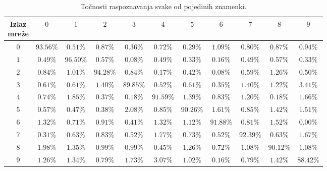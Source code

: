 \begin{table}[htb]
    \caption{Točnosti raspoznavanja svake od pojedinih znamenki.}
    \label{tab:per-number-results}
    \scriptsize
    \centering
    \setlength{\tabcolsep}{0.05cm}
    \begin{tabular}{|c|c|c|c|c|c|c|c|c|c|c|}
        \hline
        \diagbox{Očekivana\\znamenka}{Izlaz\\mreže} & $0$ & $1$ & $2$ & $3$ & $4$ & $5$ & $6$ & $7$ & $8$ & $9$ \\
        \hline
        $0$ & $\boldsymbol{93.56\%}$ & $0.51\%$ & $0.87\%$ & $0.36\%$ & $0.72\%$ & $0.29\%$ & $1.09\%$ & $0.80\%$
        & $0.87\%$ & $0.94\%$ \\
        \hline
        $1$ & $0.49\%$ & $\boldsymbol{96.50\%}$ & $0.57\%$ & $0.08\%$ & $0.49\%$ & $0.33\%$ & $0.16\%$ & $0.49\%$
        & $0.57\%$ & $0.33\%$ \\
        \hline
        $2$ & $0.84\%$ & $1.01\%$ & $\boldsymbol{94.28\%}$ & $0.84\%$ & $0.17\%$ & $0.42\%$ & $0.08\%$ & $0.59\%$
        & $1.26\%$ & $0.50\%$ \\
        \hline
        $3$ & $0.61\%$ & $0.61\%$ & $1.40\%$ & $\boldsymbol{89.85\%}$ & $0.52\%$ & $0.61\%$ & $0.35\%$ & $1.40\%$
        & $1.22\%$ & $3.41\%$ \\
        \hline
        $4$ & $0.74\%$ & $1.85\%$ & $0.37\%$ & $0.18\%$ & $\boldsymbol{91.59\%}$ & $1.39\%$ & $0.83\%$ & $1.20\%$
        & $0.18\%$ & $1.66\%$ \\
        \hline
        $5$ & $0.57\%$ & $0.47\%$ & $0.38\%$ & $2.08\%$ & $0.85\%$ & $\boldsymbol{90.26\%}$ & $1.61\%$ & $0.85\%$
        & $1.42\%$ & $1.51\%$ \\
        \hline
        $6$ & $1.32\%$ & $0.71\%$ & $0.91\%$ & $0.41\%$ & $1.32\%$ & $1.12\%$ & $\boldsymbol{91.88\%}$ & $0.81\%$
        & $1.52\%$ & $0.00\%$ \\
        \hline
        $7$ & $0.31\%$ & $0.63\%$ & $0.83\%$ & $0.52\%$ & $1.77\%$ & $0.73\%$ & $0.52\%$ & $\boldsymbol{92.39\%}$
        & $0.63\%$ & $1.67\%$ \\
        \hline
        $8$ & $1.98\%$ & $1.35\%$ & $0.99\%$ & $0.99\%$ & $0.45\%$ & $1.26\%$ & $0.72\%$ & $1.08\%$
        & $\boldsymbol{90.12\%}$ & $1.08\%$ \\
        \hline
        $9$ & $1.26\%$ & $1.34\%$ & $0.79\%$ & $1.73\%$ & $3.07\%$ & $1.02\%$ & $0.16\%$ & $0.79\%$
        & $1.42\%$ & $\boldsymbol{88.42\%}$ \\
        \hline
    \end{tabular}
\end{table}
